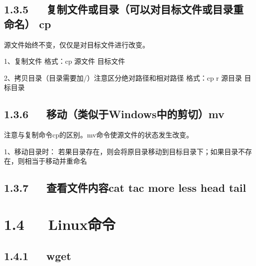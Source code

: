 \documentclass[letterpaper,12pt,english]{sphinxmanual}
\begin{document}
\subsection{1.3.5   复制文件或目录（可以对目标文件或目录重命名） cp}
\label{\detokenize{001software/001install/linux:id4}}
\begin{sphinxVerbatim}[commandchars=\\\{\}]
源文件始终不变，仅仅是对目标文件进行改变。

1、复制文件
格式：cp 源文件 目标文件

2、拷贝目录（目录需要加/）注意区分绝对路径和相对路径
格式：cp \PYGZhy{}r 源目录 目标目录
\end{sphinxVerbatim}


\subsection{1.3.6   移动（类似于Windows中的剪切）mv}
\label{\detokenize{001software/001install/linux:windows-mv}}
\begin{sphinxVerbatim}[commandchars=\\\{\}]
注意与复制命令cp的区别。mv命令使源文件的状态发生改变。

1、移动目录时：
若果目录存在，则会将原目录移动到目标目录下；如果目录不存在，则相当于移动并重命名
\end{sphinxVerbatim}


\subsection{1.3.7   查看文件内容cat tac more less head tail}
\label{\detokenize{001software/001install/linux:cat-tac-more-less-head-tail}}

\section{1.4   Linux命令}
\label{\detokenize{001software/001install/linux:id5}}


\subsection{1.4.1   wget}
\label{\detokenize{001software/001install/linux:wget}}

\end{document}
